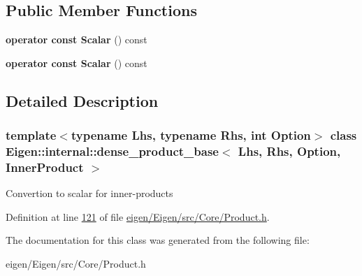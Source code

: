 \subsection*{Public Member Functions}
\begin{DoxyCompactItemize}
\item 
\mbox{\label{class_eigen_1_1internal_1_1dense__product__base_3_01_lhs_00_01_rhs_00_01_option_00_01_inner_product_01_4_ada814641d49d32d5cf959ddea70fa6a5}} 
{\bfseries operator const Scalar} () const
\item 
\mbox{\label{class_eigen_1_1internal_1_1dense__product__base_3_01_lhs_00_01_rhs_00_01_option_00_01_inner_product_01_4_ada814641d49d32d5cf959ddea70fa6a5}} 
{\bfseries operator const Scalar} () const
\end{DoxyCompactItemize}


\subsection{Detailed Description}
\subsubsection*{template$<$typename Lhs, typename Rhs, int Option$>$\newline
class Eigen\+::internal\+::dense\+\_\+product\+\_\+base$<$ Lhs, Rhs, Option, Inner\+Product $>$}

Convertion to scalar for inner-\/products 

Definition at line \hyperlink{eigen_2_eigen_2src_2_core_2_product_8h_source_l00121}{121} of file \hyperlink{eigen_2_eigen_2src_2_core_2_product_8h_source}{eigen/\+Eigen/src/\+Core/\+Product.\+h}.



The documentation for this class was generated from the following file\+:\begin{DoxyCompactItemize}
\item 
eigen/\+Eigen/src/\+Core/\+Product.\+h\end{DoxyCompactItemize}
